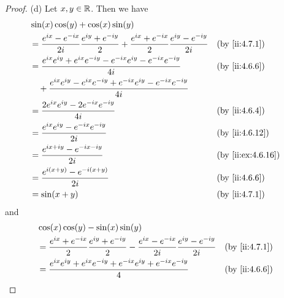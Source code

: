 \begin{proof}{(d)}
  Let \(x, y \in \mathbb{R}\).
  Then we have
  \begin{align*}
     & \sin(x) \cos(y) + \cos(x) \sin(y)                                                                                                                         \\
     & = \dfrac{e^{i x} - e^{- i x}}{2 i} \dfrac{e^{i y} + e^{- i y}}{2} + \dfrac{e^{i x} + e^{- i x}}{2} \dfrac{e^{i y} - e^{- i y}}{2i} &  & \by{ii:4.7.1}     \\
     & = \dfrac{e^{i x} e^{i y} + e^{i x} e^{- i y} - e^{- i x} e^{i y} - e^{- i x} e^{- i y}}{4i}                                        &  & \by{ii:4.6.6}     \\
     & \quad + \dfrac{e^{i x} e^{i y} - e^{i x} e^{- i y} + e^{- i x} e^{i y} - e^{- i x} e^{- i y}}{4i}                                                         \\
     & = \dfrac{2 e^{i x} e^{i y} - 2 e^{- i x} e^{- i y}}{4i}                                                                            &  & \by{ii:4.6.4}     \\
     & = \dfrac{e^{i x} e^{i y} - e^{- i x} e^{- i y}}{2i}                                                                                &  & \by{ii:4.6.12}    \\
     & = \dfrac{e^{i x + i y} - e^{- i x - i y}}{2i}                                                                                      &  & \by{ii:ex:4.6.16} \\
     & = \dfrac{e^{i (x + y)} - e^{- i (x + y)}}{2i}                                                                                      &  & \by{ii:4.6.6}     \\
     & = \sin(x + y)                                                                                                                      &  & \by{ii:4.7.1}
  \end{align*}
  and
  \begin{align*}
     & \cos(x) \cos(y) - \sin(x) \sin(y)                                                                                                                        \\
     & = \dfrac{e^{i x} + e^{- i x}}{2} \dfrac{e^{i y} + e^{- i y}}{2} - \dfrac{e^{i x} - e^{- i x}}{2i} \dfrac{e^{i y} - e^{- i y}}{2i} &  & \by{ii:4.7.1}     \\
     & = \dfrac{e^{i x} e^{i y} + e^{i x} e^{- i y} + e^{- i x} e^{i y} + e^{- i x} e^{- i y}}{4}                                        &  & \by{ii:4.6.6}     \\

\end{align*}
\end{proof}
